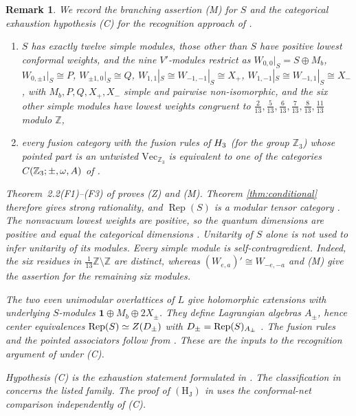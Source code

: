 \documentclass[leqno]{article}
\let\cal\relax
\newcommand{\cal}{\mathcal}
\newcommand{\Z}{\ensuremath{\mathbb{Z}}}
\DeclareMathOperator{\Rep}{Rep}
\newtheorem{remark}[thm]{Remark}
\numberwithin{equation}{section}
\begin{document}
\begin{remark}\normalfont
\label{rem:categorical-programme}
We record the branching assertion (M) for $S$ and the categorical exhaustion hypothesis (C) for the recognition approach of \cite{Rie26b}.
\begin{enumerate}
\item[(M)] $S$ has exactly twelve simple modules, those other than $S$ have positive lowest conformal weights, and the nine $V'$-modules restrict as $W_{0,0}|_S = S \oplus M_b$, $W_{0,\pm 1}|_S \cong P$, $W_{\pm 1,0}|_S \cong Q$, $W_{1,1}|_S \cong W_{-1,-1}|_S \cong X_+$, $W_{1,-1}|_S \cong W_{-1,1}|_S \cong X_-$, with $M_b, P, Q, X_+, X_-$ simple and pairwise non-isomorphic, and the six other simple modules have lowest weights congruent to $\frac{2}{13}, \frac{5}{13}, \frac{6}{13}, \frac{7}{13}, \frac{8}{13}, \frac{11}{13}$ modulo $\Z$,
\item[(C)] every fusion category with the fusion rules of $\cal H_3$ (for the group $\Z_3$) whose pointed part is an untwisted $\mathrm{Vec}_{\Z_3}$ is equivalent to one of the categories $\cal C(\Z_3;\pm,\omega,A)$ of \cite[Theorem 2]{EvG17}.
\end{enumerate}
Theorem~2.2(F1)--(F3) of \cite{ArhIII} proves (Z) and (M). Theorem \ref{thm:conditional} therefore gives strong rationality, and $\Rep(S)$ is a modular tensor category \cite{Hua08}. The nonvacuum lowest weights are positive, so the quantum dimensions are positive \cite[Lemma 4.2]{DJX13} and equal the categorical dimensions \cite{Hua08}. Unitarity of $S$ alone is not used to infer unitarity of its modules. Every simple module is self-contragredient. Indeed, the six residues in $\frac{1}{13}\Z \setminus \Z$ are distinct, whereas $(W_{e,a})' \cong W_{-e,-a}$ and \textup{(M)} give the assertion for the remaining six modules.

The two even unimodular overlattices of $L$ give holomorphic extensions with underlying $S$-modules $\mathbf 1 \oplus M_b \oplus 2X_\pm$. They define Lagrangian algebras $A_\pm$, hence center equivalences $\Rep(S) \simeq Z(\cal D_\pm)$ with $\cal D_\pm = \Rep(S)_{A_\pm}$ \cite{DMNO13}. The fusion rules and the pointed associators follow from \cite[Theorem 9.1]{ArhIII}. These are the inputs to the recognition argument of \cite[Sections 11.3 and 12--13]{Rie26b} under (C).

Hypothesis \textup{(C)} is the exhaustion statement formulated in \cite[Proposition 12.5]{Rie26b}. The classification in \cite[Theorem 2]{EvG17} concerns the listed family. The proof of $\mathrm{(H_J)}$ in \cite[Theorem 6.1]{ArhIII} uses the conformal-net comparison independently of (C).
\end{remark}
\end{document}

